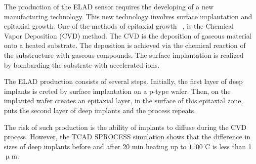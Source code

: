 
The production of the ELAD sensor requires the developing of a new manufacturing technology. 
This new technology involves surface implantation and epitaxial growth. 
One of the methods of epitaxial growth ~\cite{Lutz}, is the Chemical Vapor Deposition (CVD) method. The CVD is the deposition of gaseous material onto a heated substrate. 
The deposition is achieved via the chemical reaction of the substructure with gaseous compounds. 
The surface implantation is realized by bombarding the substrate with accelerated ions.

The ELAD production consists of several steps. Initially, the first layer of deep implants is creted by surface implantation on a p-type wafer. 
Then, on the implanted wafer creates an epitaxial layer, in the surface of this epitaxial zone, puts the second layer of deep implants and the process repeats. 

The risk of such production is the ability of implants to diffuse during the CVD process. 
However, the TCAD SPROCESS simulation shows that the difference in sizes of deep implants before and after 20 min heating up to $1100^\circ$C is less than 1 $\upmu$m.
